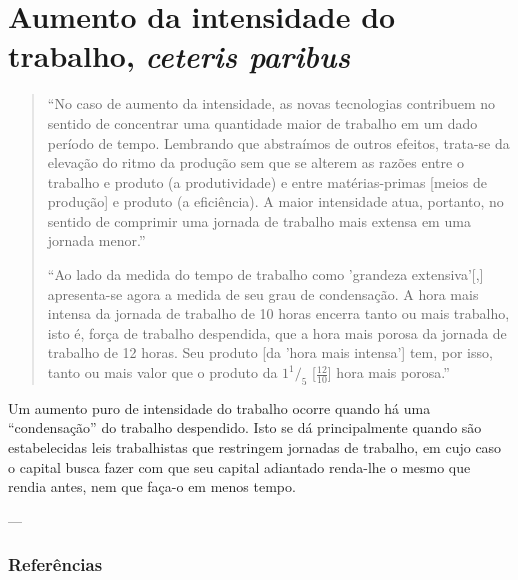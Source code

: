 \section{Aumento da intensidade do trabalho, \textit{ceteris paribus}}
\begin{quote}
``No caso de aumento da intensidade, as novas tecnologias contribuem no sentido de concentrar uma quantidade maior de trabalho em um dado período de tempo. Lembrando que abstraímos de outros efeitos, trata-se da elevação do ritmo da produção sem que se alterem as razões entre o trabalho e produto (a produtividade) e entre matérias-primas [meios de produção] e produto (a eficiência). A maior intensidade atua, portanto, no sentido de comprimir uma jornada de trabalho mais extensa em uma jornada menor.'' \parencite[p. 234]{SaBarreto2021a}

``Ao lado da medida do tempo de trabalho como 'grandeza extensiva'[,] apresenta-se agora a medida de seu grau de condensação. A hora mais intensa da jornada de trabalho de 10 horas encerra tanto ou mais trabalho, isto é, força de trabalho despendida, que a hora mais porosa da jornada de trabalho de 12 horas. Seu produto [da 'hora mais intensa'] tem, por isso, tanto ou mais valor que o produto da $1 ^1/_{5}$ [$\frac{12}{10}$] hora mais porosa.'' \parencite[p. 482-3]{Marx2017}
\end{quote}

Um aumento puro de intensidade do trabalho ocorre quando há uma ``condensação'' do trabalho despendido. Isto se dá principalmente quando são estabelecidas leis trabalhistas que restringem jornadas de trabalho, em cujo caso o capital busca fazer com que seu capital adiantado renda-lhe o mesmo que rendia antes, nem que faça-o em menos tempo.

---
\subsubsection{Referências}
